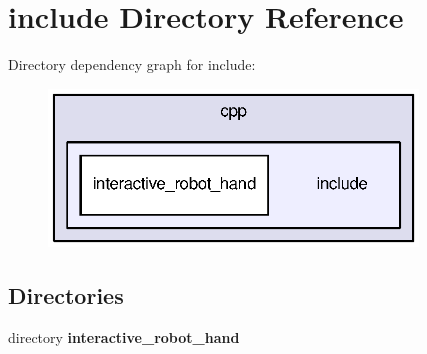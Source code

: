 \section{include Directory Reference}
\label{dir_c21fb3a7994e371ac1cbff92d428130d}
Directory dependency graph for include\-:
\nopagebreak
\begin{figure}[H]
\begin{center}
\leavevmode
\includegraphics[width=278pt]{dir_c21fb3a7994e371ac1cbff92d428130d_dep}
\end{center}
\end{figure}
\subsection*{Directories}
\begin{DoxyCompactItemize}
\item 
directory {\bf interactive\-\_\-robot\-\_\-hand}
\end{DoxyCompactItemize}
